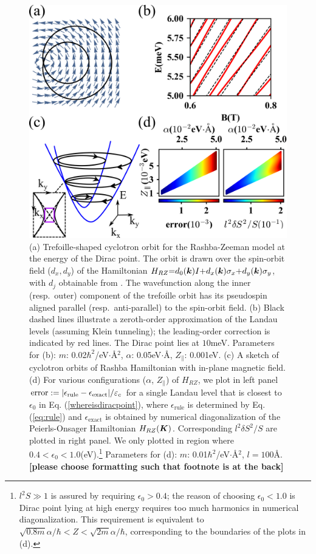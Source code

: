 \documentclass[aps, prb, showpacs, twocolumn, notitlepage, superscriptaddress]{revtex4-1}
\begin{document}
\begin{figure}
\includegraphics[width=1.0\columnwidth]{RZ.png}
\caption{(a) Trefoille-shaped cyclotron orbit for the Rashba-Zeeman model at the energy of the Dirac point. The orbit is drawn over the  {spin-orbit field} ($d_x,d_y$) of the Hamiltonian $H_{RZ}{=}d_0(\boldsymbol{k})I{+}d_x(\boldsymbol{k})\sigma_x{+}d_y(\boldsymbol{k})\sigma_y$, with $d_j$ obtainable from . The wavefunction along the inner (resp.\ outer) component of the trefoille orbit has its pseudospin aligned parallel (resp.\ anti-parallel) to the spin-orbit field. (b) Black dashed lines illustrate a zeroth-order approximation of the Landau levels (assuming Klein tunneling); the leading-order correction is indicated by red lines. The Dirac point lies at $10$meV. Parameters for (b): $m$: 0.02$\hbar^2$/eV$\cdot$\AA$^2$, $\alpha$: 0.05eV$\cdot$\AA, $Z_\parallel$: 0.001eV. (c) A sketch of cyclotron orbits of Rashba Hamiltonian with in-plane magnetic field. (d) For various configurations ($\alpha$, $Z_\parallel$) of $H_{RZ}$, we plot in left panel $\text{error}:=|\epsilon_\text{rule}-\epsilon_\text{exact}|/\varepsilon_c$ for a single Landau level that is closest to $\epsilon_0$ in Eq. (\ref{whereisdiracpoint}), where $\epsilon_\text{rule}$ is determined by Eq. (\ref{eq:rule}) and $\epsilon_{\text{exact}}$ is obtained by numerical diagonalization of the Peierls-Onsager Hamiltonian $H_{RZ}(\boldsymbol{K})$. Corresponding $l^2 \delta S^2/S$ are plotted in right panel. We only plotted in region where $0.4<\epsilon_0<1.0$(eV).\footnote{$l^2S\gg 1$ is assured by requiring $\epsilon_0>0.4$; the reason of choosing $\epsilon_0<1.0$ is Dirac point lying at high energy requires too much harmonics in numerical diagonalization. This requirement is equivalent to $\sqrt{0.8m}\alpha/\hbar<Z<\sqrt{2m}\alpha/\hbar$, corresponding to the boundaries of the plots in (d).} Parameters for (d): $m$: 0.01$\hbar^2$/eV$\cdot$\AA$^2$, $l=100$\AA. \textbf{[please choose formatting such that footnote is at the back]} \label{fig:RZ}}
\end{figure}
\end{document}
